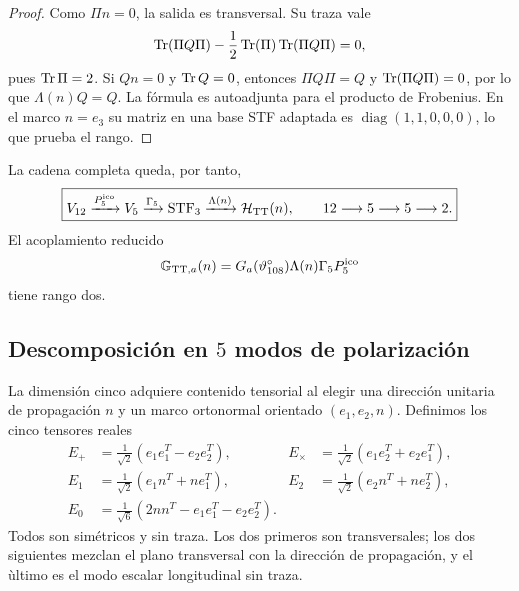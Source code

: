 \begin{proof}
Como \(\Pi n=0\), la salida es transversal. Su traza vale
\[
\operatorname{Tr}(\Pi Q\Pi)-\frac12\operatorname{Tr}(\Pi)\operatorname{Tr}(\Pi Q\Pi)=0,
\]
pues \(\operatorname{Tr}\Pi=2\). Si \(Qn=0\) y \(\operatorname{Tr} Q=0\), entonces
\(\Pi Q\Pi=Q\) y \(\operatorname{Tr}(\Pi Q\Pi)=0\), por lo que
\(\Lambda(n)Q=Q\). La f\'ormula es autoadjunta para el producto de
Frobenius. En el marco \(n=e_3\) su matriz en una base STF adaptada es
\(\operatorname{diag}(1,1,0,0,0)\), lo que prueba el rango.
\end{proof}

La cadena completa queda, por tanto,
\begin{equation}
\label{ii:pent:eq:gravity-12-5-5-2}
\boxed{
V_{12}\xrightarrow{P^{\mathrm{ico}}_5}V_5
\xrightarrow{\Gamma_5}\operatorname{STF}_3
\xrightarrow{\Lambda(n)}\mathcal H_{\rm TT}(n),
\qquad 12\longrightarrow5\longrightarrow5\longrightarrow2.}
\end{equation}
El acoplamiento reducido
\begin{equation}
\label{ii:pent:eq:gravity-effective-map}
\mathbb G_{{\rm TT},a}(n)
=G_a(\vartheta^\circ_{108})\Lambda(n)\Gamma_5P^{\mathrm{ico}}_5
\end{equation}
tiene rango dos.

\subsection{Descomposición en \(5\) modos de polarización}

La dimensi\'on cinco adquiere contenido tensorial al elegir una direcci\'on
unitaria de propagaci\'on \(n\) y un marco ortonormal orientado
\((e_1,e_2,n)\). Definimos los cinco tensores reales
\begin{align}
E_{+}&=\frac1{\sqrt2}(e_1e_1^T-e_2e_2^T),
&E_{\times}&=\frac1{\sqrt2}(e_1e_2^T+e_2e_1^T),
\label{ii:pent:eq:gravity-helicity2-real}\\
E_{1}&=\frac1{\sqrt2}(e_1n^T+ne_1^T),
&E_{2}&=\frac1{\sqrt2}(e_2n^T+ne_2^T),
\label{ii:pent:eq:gravity-helicity1-real}\\
E_{0}&=\frac1{\sqrt6}(2nn^T-e_1e_1^T-e_2e_2^T).
\label{ii:pent:eq:gravity-helicity0-real}
\end{align}
Todos son sim\'etricos y sin traza. Los dos primeros son transversales; los
dos siguientes mezclan el plano transversal con la direcci\'on de
propagaci\'on, y el \`ultimo es el modo escalar longitudinal sin traza.

